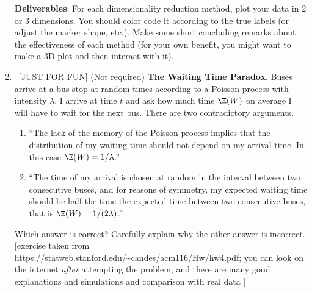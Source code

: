\documentclass[10pt, letterpaper]{scrartcl}
\begin{document}
\begin{enumerate}[align=left, leftmargin=*, label=\bfseries Problem \arabic*:]
\textbf{Deliverables}:
For each dimensionality reduction method, plot your data in 2 or 3 dimensions. You should color code it according to the true labels (or adjust the marker shape, etc.). 
Make some short concluding remarks about the effectiveness of each method (for your own benefit, you might want to make a 3D plot and then interact with it).

    
    \item \ [JUST FOR FUN] (Not required)
\textbf{The Waiting Time Paradox}. Buses arrive at a bus stop at random times according to a Poisson
process with intensity $\lambda$. I arrive at time $t$ and ask how much time $\E(W)$ on average I will
have to wait for the next bus. There are two contradictory arguments.
\begin{enumerate}
    \item ``The lack of the memory of the Poisson process implies that the distribution of my waiting
time should not depend on my arrival time. In this case $\E(W) = 1/\lambda$.''
\item ``The time of my arrival is chosen at random in the interval between two consecutive
buses, and for reasons of symmetry, my expected waiting time should be half the time the
expected time between two consecutive buses, that is $\E(W) = 1/(2\lambda)$.''
\end{enumerate}
Which answer is correct? Carefully explain why the other answer is incorrect. [exercise taken from \url{https://statweb.stanford.edu/~candes/acm116/Hw/hw4.pdf}; you can look on the internet \emph{after} attempting the problem, and there are many good explanations and simulations and comparison with real data ]
    
\end{enumerate}



    
\end{document}
